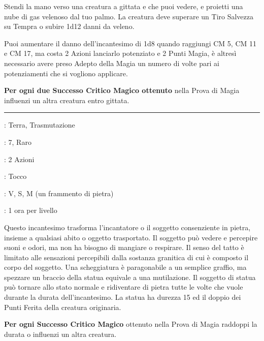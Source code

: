 \begin{multicols}{2}
Stendi la mano verso una creatura a gittata e che puoi vedere, e proietti una nube di gas velenoso dal tuo palmo. La creatura deve superare un Tiro Salvezza su Tempra o subire 1d12 danni da veleno.

Puoi aumentare il danno dell'incantesimo di 1d8 quando raggiungi CM 5, CM 11 e CM 17, ma costa 2 Azioni lanciarlo potenziato e 2 Punti Magia, è altresì necessario avere preso Adepto della Magia un numero di volte pari ai potenziamenti che si vogliono applicare.

\textbf{Per ogni due Successo Critico Magico ottenuto} nella Prova di Magia influenzi un altra creatura entro gittata.


\smallskip\noindent\rule{\linewidth}{2pt} \hypertarget{Statua}{}\smallskip{}
\noindent
\begin{description}[noitemsep, topsep=0pt, parsep=0pt, partopsep=0pt, leftmargin=0cm, labelwidth=2.8cm]
	\item[\textbf{Lista di Magia}]: Terra, Trasmutazione
	\item[\textbf{Livello}]: 7, Raro
	\item[\textbf{T. di Lancio}]: 2 Azioni
	\item[\textbf{Gittata}]: Tocco
	\item[\textbf{Componenti}]: V, S, M (un frammento di pietra)
	\item[\textbf{Durata}]: 1 ora per livello
\end{description}

Questo incantesimo trasforma l'incantatore o il soggetto consenziente in pietra, insieme a qualsiasi abito o oggetto trasportato. Il soggetto può vedere e percepire suoni e odori, ma non ha bisogno di mangiare o respirare. Il senso del tatto è limitato alle sensazioni percepibili dalla sostanza granitica di cui è composto il corpo del soggetto. Una scheggiatura è paragonabile a un semplice graffio, ma spezzare un braccio della statua equivale a una mutilazione. Il soggetto di statua può tornare allo stato normale e ridiventare di pietra tutte le volte che vuole durante la durata dell'incantesimo. La statua ha durezza 15 ed il doppio dei Punti Ferita della creatura originaria.

\textbf{Per ogni Successo Critico Magico} ottenuto nella Prova di Magia raddoppi la durata o influenzi un altra creatura.


\end{multicols}
